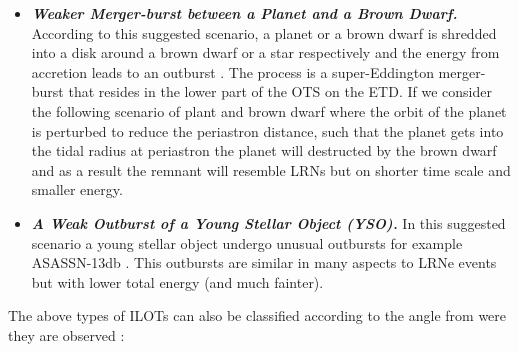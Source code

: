 \documentclass[modern]{aastex63}
\newcommand{\emphbf}[1]{\textbf{\emph{#1}}}
\begin{document}
\begin{itemize}
\item \label{plant_and_bd-ilot-item} \emphbf{Weaker Merger-burst between a Planet and a Brown Dwarf.} 
According to this suggested scenario, a planet or a brown dwarf is shredded into a disk around a brown dwarf or a star respectively and the energy from accretion leads to an outburst \citep{2011MNRAS.416.1965B}. 
The process is a super-Eddington merger-burst that resides in the lower part of the OTS on the ETD.
If we consider the following scenario of plant and brown dwarf where the orbit of the planet is perturbed to reduce the periastron distance, such that the planet gets into the tidal radius at periastron the planet will destructed by the brown dwarf and as a result the remnant will resemble LRNs but on shorter time scale and smaller energy.

\item \label{yso_outburst-ilot-item} \emphbf{A Weak Outburst of a Young Stellar Object (YSO).} 
In this suggested scenario a young stellar object undergo unusual outbursts for example ASASSN-13db \citep{2017A&A...607A.127S,2019Galax...8....2K}.
This outbursts are similar in many aspects to LRNe events but with lower total energy (and much fainter). 

\end{itemize}

The above types of ILOTs can also be classified according to the angle from were they are observed \citep[in a similar manner to the classification of galaxies and active galactic nuclii;][]{2015ARA&A..53..365N}:
\end{document}
